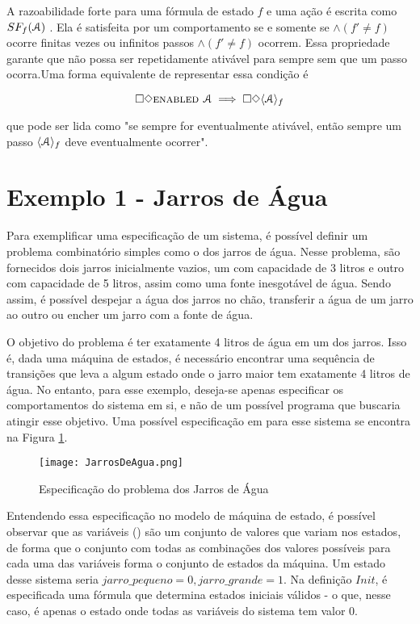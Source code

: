 A razoabilidade forte para uma fórmula de estado $f$ e uma ação \FANCYA é escrita como $SF_f (\textbf{$\mathcal{A}$})$ . Ela é satisfeita por um comportamento se e somente se \FANCYA $\land (f' \neq f)$ ocorre finitas vezes ou infinitos passos \FANCYA $\land (f' \neq f)$ ocorrem. Essa propriedade garante que \FANCYA não possa ser repetidamente ativável para sempre sem que um passo \FANCYA ocorra.Uma forma equivalente de representar essa condição é

\[\square \Diamond \textsc{enabled } \textbf{$\mathcal{A}$} \implies \square \Diamond\langle\textbf{$\mathcal{A}$}\rangle_f\]

que pode ser lida como "se sempre \FANCYA for eventualmente ativável, então sempre um passo $\langle\textbf{$\mathcal{A}$}\rangle_f$ deve eventualmente ocorrer".

\section{Exemplo 1 - Jarros de Água}
\label{exemplo1}

Para exemplificar uma especificação de um sistema, é possível definir um problema combinatório simples como o dos jarros de água. Nesse problema, são fornecidos dois jarros inicialmente vazios, um com capacidade de 3 litros e outro com capacidade de 5 litros, assim como uma fonte inesgotável de água. Sendo assim, é possível despejar a água dos jarros no chão, transferir a água de um jarro ao outro ou encher um jarro com a fonte de água.

O objetivo do problema é ter exatamente 4 litros de água em um dos jarros. Isso é, dada uma máquina de estados, é necessário encontrar uma sequência de transições que leva a algum estado onde o jarro maior tem exatamente 4 litros de água. No entanto, para esse exemplo, deseja-se apenas especificar os comportamentos do sistema em si, e não de um possível programa que buscaria atingir esse objetivo. Uma possível especificação em \TLA para esse sistema se encontra na Figura \ref{fig:ex1tla}.

\begin{figure}
  \centering
  \texttt{[image: JarrosDeAgua.png]}
  \caption{Especificação do problema dos Jarros de Água}
  \label{fig:ex1tla}
\end{figure}

Entendendo essa especificação no modelo de máquina de estado, é possível observar que as variáveis (\VARIABLES) são um conjunto de valores que variam nos estados, de forma que o conjunto com todas as combinações dos valores possíveis para cada uma das variáveis forma o conjunto de estados da máquina. Um estado desse sistema seria $jarro\_pequeno = 0, jarro\_grande = 1$. Na definição $Init$, é especificada uma fórmula que determina estados iniciais válidos - o que, nesse caso, é apenas o estado onde todas as variáveis do sistema tem valor 0.

